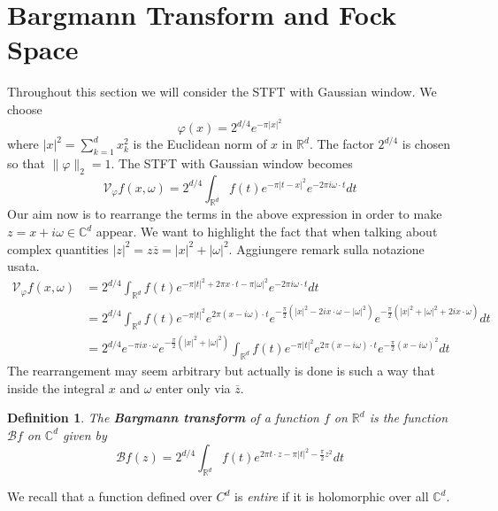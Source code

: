 \documentclass[corpo=11pt, stile=classica, tipotesi=custom,
greek, evenboxes, english]{toptesi}
\numberwithin{equation}{chapter}
\newtheorem{defi}[teo]{Definition}
\newcommand{\R}{\mathbb{R}} %
\newcommand{\V}{\mathcal{V}} %
\newcommand{\C}{\mathbb{C}} %
\newcommand{\Barg}{\mathcal{B}} %
\begin{document}
\section{Bargmann Transform and Fock Space}\label{section Fock Space and Bargmann transform}
{\color{blue} Throughout this section we will consider the STFT with Gaussian window.} We choose
\begin{equation}\label{gaussian normalized}
	\varphi(x) = 2^{d/4} e^{-\pi |x|^2}
\end{equation}
where $|x|^2 = \sum_{k=1}^d x_k^2$ is the Euclidean norm of $x$ in $\R^d$. The factor $2^{d/4}$ is chosen so that $\|\varphi\|_2=1$. The STFT with Gaussian window becomes
\begin{equation}
	\V_{\varphi}f(x,\omega) = 2^{d/4} \int_{\R^d} f(t) e^{-\pi |t-x|^2} e^{-2 \pi i \omega \cdot t} dt
\end{equation}
Our aim now is to rearrange the terms in the above expression in order to make $z=x+i\omega \in \C^d$ appear. We want to highlight the fact that when talking about complex quantities $|z|^2 = z \overline{z} = |x|^2 + |\omega|^2$. {\color{blue}  Aggiungere remark sulla notazione usata}.
\begin{align*}
	\V_{\varphi}f(x,\omega) &= 2^{d/4} \int_{\R^d} f(t) e^{-\pi |t|^2 + 2 \pi x \cdot t - \pi |\omega|^2} e^{ - 2 \pi i \omega \cdot t} dt\\
							&= 2^{d/4} \int_{\R^d} f(t) e^{-\pi |t|^2} e^{2 \pi (x - i \omega) \cdot t} e^{-\frac{\pi}{2}\left(|x|^2 - 2 i x \cdot \omega - |\omega|^2\right)} e^{-\frac{\pi}{2}\left(|x|^2 + |\omega|^2 + 2 i x \cdot \omega\right)}dt\\
							&= 2^{d/4} e^{-\pi i x \cdot \omega} e^{-\frac{\pi}{2}\left(|x|^2 + |\omega|^2\right)} \int_{\R^d} f(t) e^{-\pi |t|^2} e^{2 \pi (x-i\omega) \cdot t}e^{-\frac{\pi}{2}(x-i\omega)^2}dt
\end{align*}
The rearrangement may seem arbitrary but actually is done is such a way that inside the integral $x$ and $\omega$ enter only via $\overline{z}$.
\begin{defi}\label{Bargmann transform}
	The \textbf{Bargmann transform} of a function $f$ on $\R^d$ is the function $\Barg f$ on $\C^d$ given by
	\begin{equation}\label{Bargmann transform formula}
		\Barg f(z) = 2^{d/4} \int_{\R^d} f(t) e^{2 \pi t \cdot z - \pi |t|^2 - \frac{\pi}{2}z^2}dt
	\end{equation}
\end{defi}
We recall that a function defined over $C^d$ is \emph{entire} if it is holomorphic over all $\C^d$.
\end{document}

